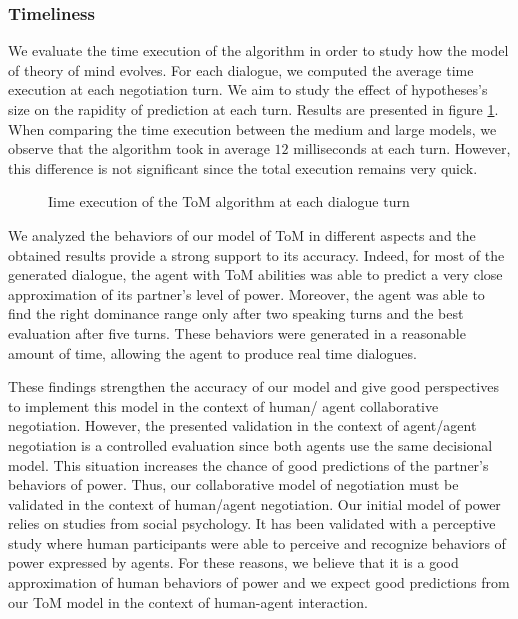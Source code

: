 \documentclass[conference, letterpaper]{IEEEtran}
\begin{document}
	
	\subsubsection{Timeliness}
	We evaluate the time execution of the algorithm in order to study how the model of theory of mind evolves. For each dialogue, we computed the average time execution at each negotiation turn. We aim to study the effect of hypotheses's size on the rapidity of prediction at each turn. Results are presented in figure \ref{fig:time}. When comparing the time execution between the medium and large models, we observe that the algorithm took in average $12$ milliseconds at each turn. However, this difference is not significant since the total execution remains very quick.
	
	\begin{figure}[]
		\caption{Iime execution of the ToM algorithm at each dialogue turn} 
		\label{fig:time}
	\end{figure}
	
	We analyzed the behaviors of our model of ToM in different aspects and the obtained results provide a strong support to its accuracy. Indeed, for most of the generated dialogue, the agent with ToM abilities was able to predict a very close approximation of its partner's level of power. Moreover, the agent was able to find the right dominance range only after two speaking turns and the best evaluation after five turns. These behaviors were generated in a reasonable amount of time, allowing the agent to produce real time dialogues.
	
	These findings strengthen the accuracy of our model and give good perspectives to implement this model in the context of human/ agent collaborative negotiation. However, the presented validation in the context of agent/agent negotiation is a controlled evaluation since both agents use the same decisional model. This situation increases the chance of good predictions of the partner's behaviors of power. 	
	Thus, our collaborative model of negotiation must be validated in the context of human/agent negotiation. Our initial model of power \cite{ouali2017computational} relies on studies from social psychology. It has been validated with a perceptive study where human participants were able to perceive and recognize behaviors of power expressed by agents. For these reasons, we believe that it is a good approximation of human behaviors of power and we expect good predictions from our ToM model in the context of human-agent interaction.
\end{document}
